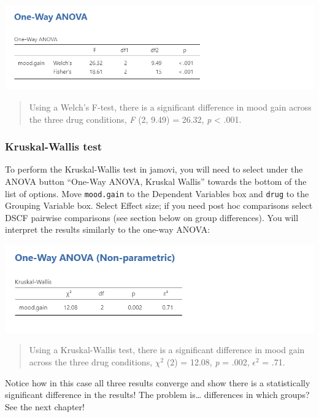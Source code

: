 \documentclass[
]{book}
\begin{document}
\includegraphics{images/04_one-way-anova/one-way_results_Welch.png}

\begin{quote}
Using a Welch's F-test, there is a significant difference in mood gain across the three drug conditions, \emph{F} (2, 9.49) = 26.32, \emph{p} \textless{} .001.
\end{quote}

\hypertarget{kruskal-wallis-test}{%
\subsubsection{Kruskal-Wallis test}\label{kruskal-wallis-test}}

To perform the Kruskal-Wallis test in jamovi, you will need to select under the ANOVA button ``One-Way ANOVA, Kruskal Wallis'' towards the bottom of the list of options. Move \texttt{mood.gain} to the Dependent Variables box and \texttt{drug} to the Grouping Variable box. Select Effect size; if you need post hoc comparisons select DSCF pairwise comparisons (see section below on group differences). You will interpret the results similarly to the one-way ANOVA:

\includegraphics{images/04_one-way-anova/one-way_results_Kruskal.png}

\begin{quote}
Using a Kruskal-Wallis test, there is a significant difference in mood gain across the three drug conditions, \(\chi^2\) (2) = 12.08, \emph{p} = .002, \(\epsilon^2\) = .71.
\end{quote}

Notice how in this case all three results converge and show there is a statistically significant difference in the results! The problem is\ldots{} differences in which groups? See the next chapter!
\end{document}
